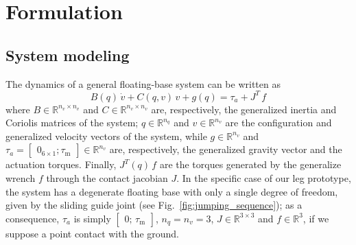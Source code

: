 \section{Formulation}\label{sec:formulation}
\subsection{System modeling}
The dynamics of a general floating-base system can be written as
\begin{equation}\label{eq:rigid_body_dyn}
B(q)\,\dot{v} +C(q, v)\,v + g(q) = \tau_{a} + J^T\,f
\end{equation}
where $B\in\mathbb{R}^{n_v\times n_v}$ and $C\in\mathbb{R}^{n_v\times n_v}$ are, respectively, the generalized inertia and Coriolis matrices of the system; $q\in\mathbb{R}^{n_q}$ and $v\in\mathbb{R}^{n_v}$ are the configuration and generalized velocity vectors of the system, while $g\in\mathbb{R}^{n_v}$ and $\tau_a=\begin{bmatrix}
0_{6\times 1};
\tau_{\mathrm{m}}
\end{bmatrix}\in\mathbb{R}^{n_v}$ are, respectively, the generalized gravity vector and the actuation torques. Finally, $J^T(q)\,f$ are the torques generated by the generalize wrench $f$ through the contact jacobian $J$. In the specific case of our leg prototype, the system has a degenerate floating base with only a single degree of freedom, given by the sliding guide joint (see Fig.~\ref{fig:jumping_sequence}); as a consequence, $\tau_a$ is simply $\begin{bmatrix}
0;\,\tau_{\mathrm{m}}\end{bmatrix}$, $n_q = n_v = 3$, $J\in\mathbb{R}^{3\times 3}$ and $f\in\mathbb{R}^3$, if we suppose a point contact with the ground.


